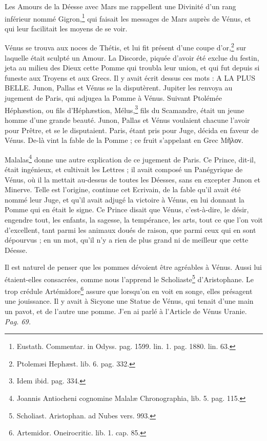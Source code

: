\documentclass[a4paper, 18pt, oneside]{article}
\begin{document}
Les Amours de la Déesse avec Mars me rappellent une Divinité d'un rang inférieur nommé Gigron,\footnote{Eustath. Commentar. in Odyss. pag. 1599. lin. 1. pag. 1880. lin. 63.} qui faisait les messages de Mars auprès de Vénus, et qui leur facilitait les moyens de se voir.

Vénus se trouva aux noces de Thétis, et lui fit présent d'une coupe d'or,\footnote{Ptolemæi Hephæst. lib. 6. pag. 332.} sur laquelle était sculpté un Amour. La Discorde, piquée d'avoir été exclue du festin, jeta au milieu des Dieux cette Pomme qui troubla leur union, et qui fut depuis si funeste aux Troyens et aux Grecs. Il y avait écrit dessus ces mots : A LA PLUS BELLE. Junon, Pallas et Vénus se la disputèrent. Jupiter les renvoya au jugement de Paris, qui adjugea la Pomme à Vénus. Suivant Ptolémée Héphæstion, ou fils d'Héphæstion, Mélus,\footnote{Idem ibid. pag. 334.} fils du Scamandre, était un jeune homme d'une grande beauté. Junon, Pallas et Vénus voulaient chacune l'avoir pour Prêtre, et se le disputaient. Paris, étant pris pour Juge, décida en faveur de Vénus. De-là vint la fable de la Pomme ; ce fruit s'appelant en Grec Μῆλον.

Malalas\footnote{Joannis Antiocheni cognomine Malalæ Chronographia, lib. 5. pag. 115.} donne une autre explication de ce jugement de Paris. Ce Prince, dit-il, était ingénieux, et cultivait les Lettres ; il avait composé un Panégyrique de Vénus, où il la mettait au-dessus de toutes les Déesses, sans en excepter Junon et Minerve. Telle est l'origine, continue cet Ecrivain, de la fable qu'il avait été nommé leur Juge, et qu'il avait adjugé la victoire à Vénus, en lui donnant la Pomme qui en était le signe. Ce Prince disait que Vénus, c'est-à-dire, le désir, engendre tout, les enfants, la sagesse, la tempérance, les arts, tout ce que l'on voit d'excellent, tant parmi les animaux doués de raison, que parmi ceux qui en sont dépourvus ; en un mot, qu'il n'y a rien de plus grand ni de meilleur que cette Déesse.

Il est naturel de penser que les pommes dévoient être agréables à Vénus. Aussi lui étaient-elles consacrées, comme nous l'apprend le Scholiaste\footnote{Scholiast. Aristophan. ad Nubes vers. 993.} d'Aristophane. Le trop crédule Artémidore\footnote{Artemidor. Oneirocritic. lib. 1. cap. 85.} assure que lorsqu'on en voit en songe, elles présagent une jouissance. Il y avait à Sicyone une Statue de Vénus, qui tenait d'une main un pavot, et de l'autre une pomme. J'en ai parlé à l'Article de Vénus Uranie. \emph{Pag. 69.}
\end{document}
